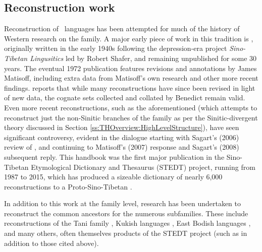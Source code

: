 \subsection{Reconstruction work}
Reconstruction of \lfam\ languages has been attempted for much of the history of Western research on the family. A major early piece of work in this tradition is , originally written in the early 1940s following the depression-era project \textit{Sino-Tibetan Lingusitics} led by Robert Shafer, and remaining unpublished for some 30 years. The eventual 1972 publication features revisions and annotations by James Matisoff, including extra data from Matisoff's own research and other more recent findings.  reports that while many reconstructions have since been revised in light of new data, the cognate sets collected and collated by Benedict remain valid. Even more recent reconstructions, such as the aforementioned  (which attempts to reconstruct just the non-Sinitic branches of the family as per the Sinitic-divergent theory discussed in Section \ref{ss:THOverview:HighLevelStructure}), have seen significant controversy, evident in the dialogue starting with Sagart's (2006) \nocite{Sagart2006} review of , and continuing to Matisoff's (2007) \nocite{Matisoff2007} response and Sagart's (2008) \nocite{Sagart2008} subsequent reply. This handbook was the first major publication in the Sino-Tibetan Etymological Dictionary and Thesaurus (STEDT) project, running from 1987 to 2015, which has produced a sizeable dictionary of nearly 6,000 reconstructions to a Proto-Sino-Tibetan \cite{STEDT}.

In addition to this work at the family level, research has been undertaken to reconstruct the common ancestors for the numerous subfamilies. These include reconstructions of the Tani family \cite{Sun1993}, Kukish languages \cite{VanBik2009}, East Bodish languages \cite{Hyslop2014a}, and many others, often themselves products of the STEDT project (such as  in addition to those cited above).

